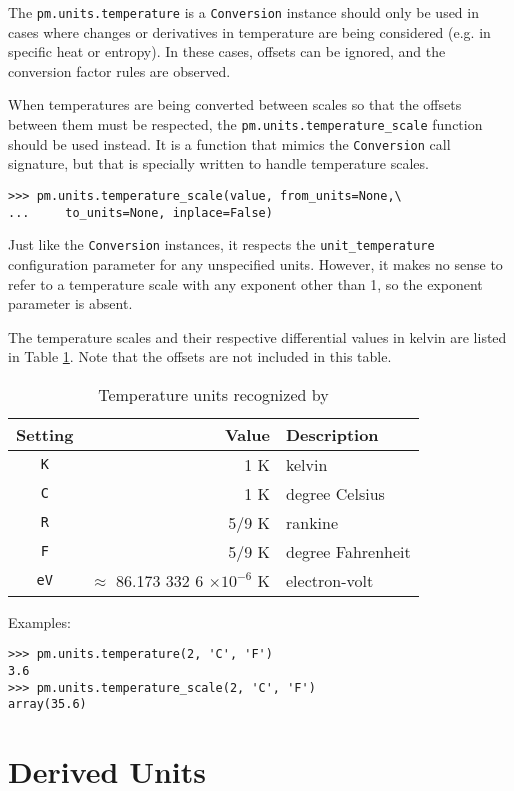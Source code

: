 The \verb|pm.units.temperature| is a \verb|Conversion| instance should only be used in cases where changes or derivatives in temperature are being considered (e.g. in specific heat or entropy).  In these cases, offsets can be ignored, and the conversion factor rules are observed.  

When temperatures are being converted between scales so that the offsets between them must be respected, the \verb|pm.units.temperature_scale| function should be used instead.  It is a function that mimics the \verb|Conversion| call signature, but that is specially written to handle temperature scales. 

\begin{lstlisting}
>>> pm.units.temperature_scale(value, from_units=None,\
...     to_units=None, inplace=False)
\end{lstlisting}

Just like the \verb|Conversion| instances, it respects the \verb|unit_temperature| configuration parameter for any unspecified units.  However, it makes no sense to refer to a temperature scale with any exponent other than 1, so the exponent parameter is absent.

The temperature scales and their respective differential values in kelvin are listed in Table \ref{tab:temperature}.  Note that the offsets are not included in this table.

\begin{table}
\centering
\caption{Temperature units recognized by \PM}\label{tab:temperature}
\begin{tabular}{crl}
\hline
Setting & Value & Description\\
\hline
\verb|K| & 1 K & kelvin\\
\verb|C| & 1 K & degree Celsius\\
\verb|R| & 5/9 K & rankine\\
\verb|F| & 5/9 K & degree Fahrenheit\\
\verb|eV| & $\approx$ 86.173 332 6 $\times 10^{-6}$ K & electron-volt\\
\hline
\end{tabular}
\end{table}

Examples:
\begin{lstlisting}
>>> pm.units.temperature(2, 'C', 'F')
3.6
>>> pm.units.temperature_scale(2, 'C', 'F')
array(35.6)
\end{lstlisting}


\section{Derived Units}

